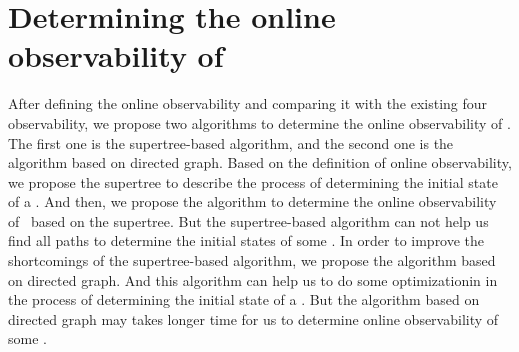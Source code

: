 \section{Determining the online observability of \BCNs}
\label{sec:deter}
After defining the online observability and comparing it with the existing four observability, we propose two algorithms to determine the online observability of \BCNs. The first one is the supertree-based algorithm, and the second one is the algorithm based on directed graph. Based on the definition of online observability, we propose the supertree to describe the process of determining the initial state of a \BCN. And then, we propose the algorithm to determine the online observability of \BCNs\ based on the supertree. But the supertree-based algorithm can not help us find all paths to determine the initial states of some \BCNs. In order to improve the shortcomings of the supertree-based algorithm, we propose the algorithm based on directed graph. And this algorithm can help us to do some optimizationin in the process of determining the initial state of a \BCN. But the algorithm based on directed graph may takes longer time for us to determine online observability of some \BCNs. 

